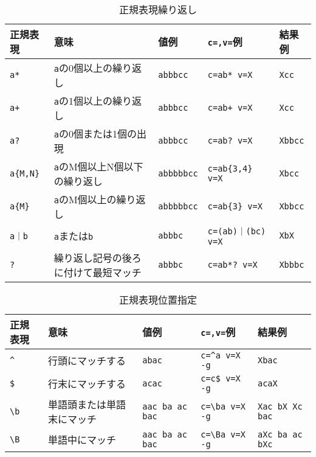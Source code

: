\begin{table}[htbp]
\begin{center}
{\small
\caption{正規表現繰り返し\label{tbl:msed_regex2}}
\begin{tabular}{l|l|l|l|l}
\hline
正規表現      & 意味                                 & 値例            & \verb|c=,v=|例          & 結果例\\
\hline
\verb|a*|     & \verb|a|の0個以上の繰り返し          & \verb|abbbcc|   & \verb|c=ab* v=X|        & \verb|Xcc|   \\
\verb|a+|     & \verb|a|の1個以上の繰り返し          & \verb|abbbcc|   & \verb|c=ab+ v=X|        & \verb|Xcc|   \\
\verb|a?|     & \verb|a|の0個または1個の出現         & \verb|abbbcc|   & \verb|c=ab? v=X|        & \verb|Xbbcc| \\
\verb|a{M,N}| & \verb|a|のM個以上N個以下の繰り返し   & \verb|abbbbbcc| & \verb|c=ab{3,4} v=X|    & \verb|Xbcc|  \\
\verb|a{M}|   & \verb|a|のM個以上の繰り返し          & \verb|abbbbbcc| & \verb|c=ab{3} v=X|      & \verb|Xbbcc| \\
\verb/a｜b/   & \verb|a|または\verb|b|               & \verb|abbbc|    & \verb/c=(ab)｜(bc) v=X/ & \verb|XbX|   \\
\verb|?|      & 繰り返し記号の後ろに付けて最短マッチ & \verb|abbbc|    & \verb|c=ab*? v=X|       & \verb|Xbbbc| \\
\hline
\end{tabular} 
}
\end{center}
\end{table} 

\begin{table}[htbp]
\begin{center}
{\small
\caption{正規表現位置指定\label{tbl:msed_regex3}}
\begin{tabular}{l|l|l|l|l}
\hline
正規表現  & 意味                       & 値例                 & \verb|c=,v=|例      & 結果例\\
\hline
\verb|^|  & 行頭にマッチする           & \verb|abac|          & \verb|c=^a v=X -g|  & \verb|Xbac|\\
\verb|$|  & 行末にマッチする           & \verb|acac|          & \verb|c=c$ v=X -g|  & \verb|acaX|\\
\verb|\b| & 単語頭または単語末にマッチ & \verb|aac ba ac bac| & \verb|c=\ba v=X -g| & \verb|Xac bX Xc bac|\\
\verb|\B| & 単語中にマッチ             & \verb|aac ba ac bac| & \verb|c=\Ba v=X -g| & \verb|aXc ba ac bXc|\\
\hline
\end{tabular} 
}
\end{center}
\end{table} 

